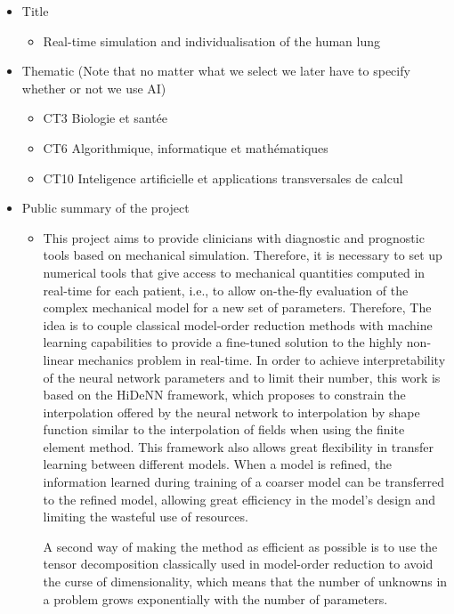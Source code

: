  \begin{itemize}
     \item Title
     \begin{itemize}
         \item Real-time simulation and individualisation of the human lung
     \end{itemize}
     \item Thematic (Note that no matter what we select we later have to specify whether or not we use AI)
     \begin{itemize}
         \item CT3 Biologie et santée
         \item CT6 Algorithmique, informatique et mathématiques 
         \item CT10 Inteligence artificielle et applications transversales de calcul 
     \end{itemize}
     \item Public summary of the project 
     \begin{itemize}
         \item This project aims to provide clinicians with diagnostic and prognostic tools based on mechanical simulation. Therefore, it is necessary to set up numerical tools that give access to mechanical quantities computed in real-time for each patient, i.e., to allow on-the-fly evaluation of the complex mechanical model for a new set of parameters. Therefore, The idea is to couple classical model-order reduction methods with machine learning capabilities to provide a fine-tuned solution to the highly non-linear mechanics problem in real-time. In order to achieve interpretability of the neural network parameters and to limit their number, this work is based on the HiDeNN framework, which proposes to constrain the interpolation offered by the neural network to interpolation by shape function similar to the interpolation of fields when using the finite element method. This framework also allows great flexibility in transfer learning between different models. When a model is refined, the information learned during training of a coarser model can be transferred to the refined model, allowing great efficiency in the model's design and limiting the wasteful use of resources.
         
A second way of making the method as efficient as possible is to use the tensor decomposition classically used in model-order reduction to avoid the curse of dimensionality, which means that the number of unknowns in a problem grows exponentially with the number of parameters.


\end{itemize}
\end{itemize}
